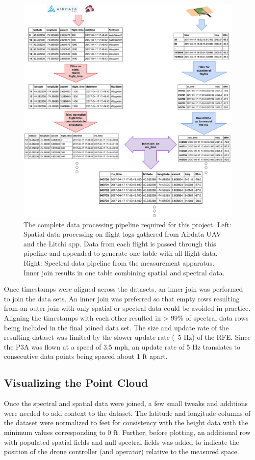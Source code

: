 \documentclass[pageno]{jpaper}
\begin{document}
\begin{figure}[!ht]
	\caption{The complete data processing pipeline required for this project. Left: Spatial data processing on flight logs gathered from Airdata UAV and the Litchi app. Data from each flight is passed through this pipeline and appended to generate one table with all flight data. Right: Spectral data pipeline from the measurement apparatus. Inner join results in one table combining spatial and spectral data.}
	\includegraphics{data_pipeline}
	\centering
\end{figure}

Once timestamps were aligned across the datasets, an inner join was performed to join the data sets. An inner join was preferred so that empty rows resulting from an outer join with only spatial or spectral data could be avoided in practice. Aligning the timestamps with each other resulted in > 99\% of spectral data rows being included in the final joined data set. The size and update rate of the resulting dataset was limited by the slower update rate (~5 Hz) of the RFE. Since the P3A was flown at a speed of 3.5 mph, an update rate of 5 Hz translates to consecutive data points being spaced about 1 ft apart. 

\subsection{Visualizing the Point Cloud}
Once the spectral and spatial data were joined, a few small tweaks and additions were needed to add context to the dataset. The latitude and longitude columns of the dataset were normalized to feet for consistency with the height data with the minimum values corresponding to 0 ft. Further, before plotting, an additional row with populated spatial fields and null spectral fields was added to indicate the position of the drone controller (and operator) relative to the measured space. 
\end{document}

